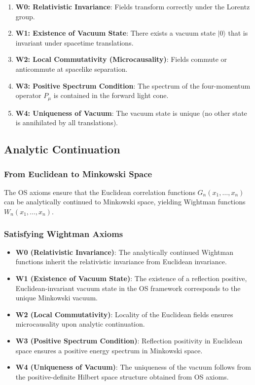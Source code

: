 \begin{enumerate}
    \item \textbf{W0: Relativistic Invariance}: Fields transform correctly under the Lorentz group.
    
    \item \textbf{W1: Existence of Vacuum State}: There exists a vacuum state \(|0\rangle\) that is invariant under spacetime translations.
    
    \item \textbf{W2: Local Commutativity (Microcausality)}: Fields commute or anticommute at spacelike separation.
    
    \item \textbf{W3: Positive Spectrum Condition}: The spectrum of the four-momentum operator \(P_\mu\) is contained in the forward light cone.
    
    \item \textbf{W4: Uniqueness of Vacuum}: The vacuum state is unique (no other state is annihilated by all translations).
\end{enumerate}

\subsection{Analytic Continuation}

\subsubsection{From Euclidean to Minkowski Space} The OS axioms ensure that the Euclidean correlation functions \(G_n(x_1, \ldots, x_n)\) can be analytically continued to Minkowski space, yielding Wightman functions \(W_n(x_1, \ldots, x_n)\).

\subsubsection{Satisfying Wightman Axioms}

\begin{itemize}
    \item \textbf{W0 (Relativistic Invariance)}: The analytically continued Wightman functions inherit the relativistic invariance from Euclidean invariance.
    
    \item \textbf{W1 (Existence of Vacuum State)}: The existence of a reflection positive, Euclidean-invariant vacuum state in the OS framework corresponds to the unique Minkowski vacuum.
    
    \item \textbf{W2 (Local Commutativity)}: Locality of the Euclidean fields ensures microcausality upon analytic continuation.
    
    \item \textbf{W3 (Positive Spectrum Condition)}: Reflection positivity in Euclidean space ensures a positive energy spectrum in Minkowski space.
    
    \item \textbf{W4 (Uniqueness of Vacuum)}: The uniqueness of the vacuum follows from the positive-definite Hilbert space structure obtained from OS axioms.
\end{itemize}


